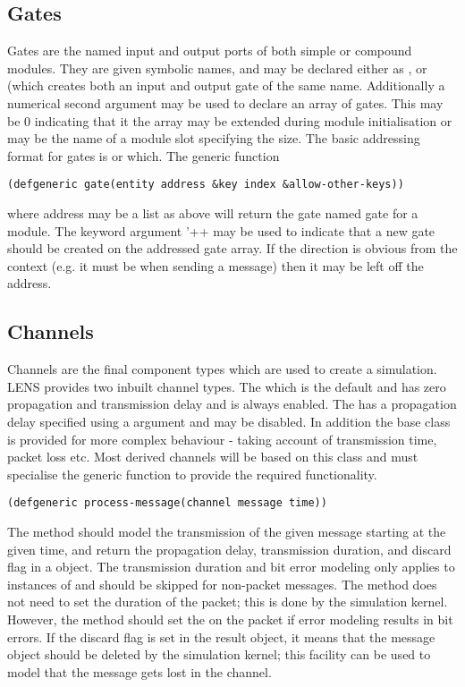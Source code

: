 \documentclass[a4paper,11pt,twoside,openany]{report}
\newcommand{\acr}[1]{\acrshort{#1}}
\begin{document}
\subsection{Gates}
Gates are the named input and output ports of both simple or compound
modules. They are given symbolic names,  and may be declared either as
,  or  (which creates both an input
and output gate of the same name. Additionally a numerical second
argument may be used to declare an array of gates. This may be 0
indicating that it the array may be extended during module
initialisation or may be the name of a module slot specifying the
size. The basic addressing
format for gates is  or 
which. The generic function
\begin{lstlisting}
(defgeneric gate(entity address &key index &allow-other-keys))
\end{lstlisting}
where address may be a list as above will return the gate named gate
for a module. The  keyword argument '++ may be used to
indicate that a new gate should be created on the addressed gate
array. If the direction is obvious from the context (e.g. it must be
 when sending a message) then it may be left off the
address.


\subsection{Channels}
Channels are the final component types which are used to create a
simulation. \acr{LENS} provides two inbuilt channel types. The
 which is the default and has zero
propagation and transmission delay and is always enabled. The
 has a propagation delay specified using a
 argument and may be disabled. In addition the
 base class is provided for more complex
behaviour - taking account of transmission time, packet loss etc. Most
derived channels will be based on this class and must specialise the
 generic function to provide the required
functionality.

\begin{lstlisting}
(defgeneric process-message(channel message time))
\end{lstlisting}

The method should model the transmission of the given message starting
at the given time, and return the propagation delay, transmission
duration, and discard flag in a  object. The
transmission duration and bit error modeling only applies to instances
of  and should be skipped for non-packet messages. The
method does not need to set the duration of the packet; this is done
by the simulation kernel. However, the method should set the 
on the packet if error modeling results in bit errors. If the
discard flag is set in the result object, it means that the message
object should be deleted by the simulation kernel; this facility can
be used to model that the message gets lost in the channel.
\end{document}
